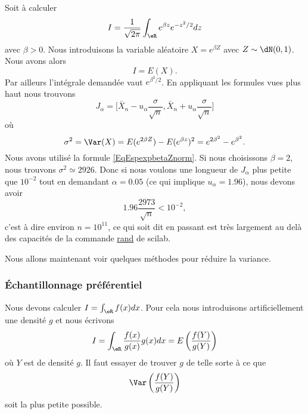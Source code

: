 \begin{example}
    Soit à calculer 
    \begin{equation}
        I=\frac{1}{ \sqrt{2\pi} }\int_{\eR} e^{\beta z} e^{-z^2/2}dz
    \end{equation}
    avec \( \beta>0\). Nous introduisons la variable aléatoire \( X= e^{\beta Z}\) avec \( Z\sim\dN(0,1)\). Nous avons alors 
    \begin{equation}
        I=E(X).
    \end{equation}
    Par ailleurs l'intégrale demandée vaut \(  e^{\beta^2/2}\). En appliquant les formules vues plus haut nous trouvons
    \begin{equation}
        J_{\alpha}=\big[ \bar X_n-u_{\alpha}\frac{ \sigma }{ \sqrt{n} },\bar X_n+u_{\alpha}\frac{ \sigma }{ \sqrt{n} } \big]
    \end{equation}
    où
    \begin{equation}
        \sigma^2=\Var(X)=E( e^{2\beta Z})-E( e^{\beta z})^2= e^{2\beta^2}- e^{\beta^2}.
    \end{equation}
    Nous avons utilisé la formule \eqref{EqEspexpbetaZnorm}. Si nous choisissons \( \beta=2\), nous trouvons \( \sigma^2\simeq 2926\). Donc si nous voulons une longueur de \( J_{\alpha}\) plus petite que \( 10^{-2}\) tout en demandant \( \alpha=0.05\) (ce qui implique \( u_{\alpha}=1.96\)), nous devons avoir
    \begin{equation}
        1.96\frac{ 2973 }{ \sqrt{n} }<10^{-2},
    \end{equation}
    c'est à dire environ \( n=10^{11}\), ce qui soit dit en passant est très largement au delà des capacités de la commande \href{https://help.scilab.org/docs/5.4.0/fr_FR/rand.html}{rand} de scilab.
\end{example}

Nous allons maintenant voir quelques méthodes pour réduire la variance.

\subsubsection{Échantillonnage préférentiel}

Nous devons calculer \( I=\int_{\eR}f(x)dx\). Pour cela nous introduisons artificiellement une densité \( g\) et nous écrivons
\begin{equation}
    I=\int_{\eR}\frac{ f(x) }{ g(x) }g(x)dx=E\left( \frac{ f(Y) }{ g(Y) } \right)
\end{equation}
où \( Y\) est de densité \( g\). Il faut essayer de trouver \( g\) de telle sorte à ce que 
\begin{equation}
    \Var\left( \frac{ f(Y) }{ g(Y) } \right)
\end{equation}
soit la plus petite possible.

